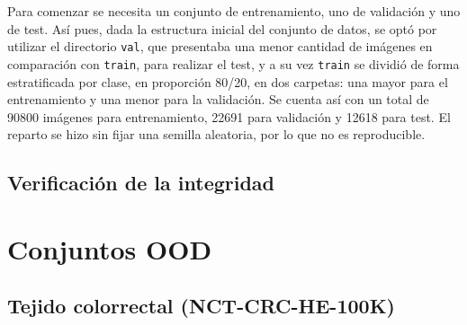 Para comenzar se necesita un conjunto de entrenamiento, uno de validación y uno de test. Así pues, dada la estructura inicial del conjunto de datos, se optó por utilizar el directorio \texttt{val}, que presentaba una menor cantidad de imágenes en comparación con \texttt{train}, para realizar el test, y a su vez \texttt{train} se dividió de forma estratificada por clase, en proporción 80/20, en dos carpetas: una mayor para el entrenamiento y una menor para la validación. Se cuenta así con un total de \num{90800} imágenes para entrenamiento, \num{22691} para validación y \num{12618} para test. 
El reparto se hizo sin fijar una semilla aleatoria, por lo que no es reproducible. 



\subsection{Verificación de la integridad}\label{sec:integridad}


\section{Conjuntos OOD}\label{sec:conjuntos-ood}

\subsection{Tejido colorrectal (NCT-CRC-HE-100K)}\label{sec:nct}

